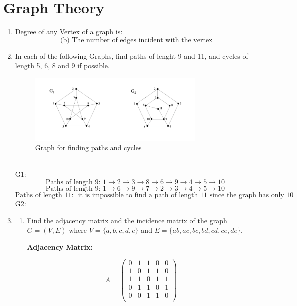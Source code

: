 \documentclass[a3paper,12pt]{extarticle} %
\begin{document}
\section{Graph Theory}
\begin{enumerate}
    \item Degree of any Vertex of a graph is:
    \[
        \text{ (b) The number of edges incident with the vertex}
    \]
    \item In each of the following Graphs, find paths of lenght 9 and 11, and cycles of length 5, 6, 8 and 9 if possible.
    \begin{figure}[h!]
        \centering
        \includegraphics[width=0.8\textwidth]{PGM-graph.png}
        \caption{Graph for finding paths and cycles}
        \label{fig:pgm-graph}
    \end{figure}
    \\
    G1:
    \[
        \text{Paths of length 9: } 1 \rightarrow 2 \rightarrow 3 \rightarrow 8\rightarrow 6 \rightarrow 9 \rightarrow 4 \rightarrow 5 \rightarrow 10
    \]
    \[
        \text{Paths of length 9: } 1 \rightarrow 6 \rightarrow 9 \rightarrow 7\rightarrow 2 \rightarrow 3 \rightarrow 4 \rightarrow 5 \rightarrow 10
    \]
    \[
        \text{Paths of length 11: } \text{ it is impossible to find a path of length 11 since the graph has only 10 vertices}
    \]
    G2:
    \item \begin{enumerate}
        \item 
    Find the adjacency matrix and the incidence matrix of the graph \( G = (V, E) \) where
    \( V = \{a, b, c, d, e\} \) and \( E = \{ab, ac, bc, bd, cd, ce, de\} \).

    \textbf{Adjacency Matrix:}

    \[
    A = \begin{pmatrix}
    0 & 1 & 1 & 0 & 0 \\
    1 & 0 & 1 & 1 & 0 \\
    1 & 1 & 0 & 1 & 1 \\
    0 & 1 & 1 & 0 & 1 \\
    0 & 0 & 1 & 1 & 0 \\
    \end{pmatrix}
    \]


\end{enumerate}
\end{enumerate}
\end{document}
